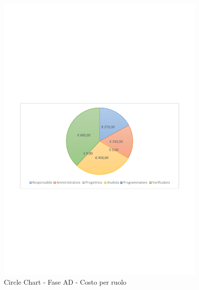 \documentclass[../PianoProgetto.tex]{subfiles}
\begin{document}
	\begin{figure}[!h]
		\centering
		\includegraphics[width=0.93\textwidth , trim=2cm 9.5cm 2cm 11cm]{grafici/AD/AD-costo}
			\caption{Circle Chart - Fase AD - Costo per ruolo}
		\label{fig:CircleChart-faseAD_costo}
	\end{figure}
\vfill	
\end{document}
